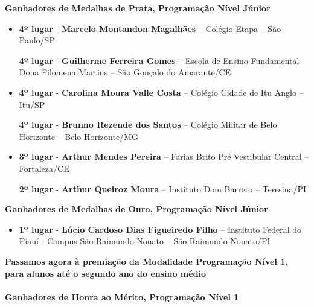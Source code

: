 \documentclass{article}
\begin{document}
\textbf{\color{blue}Ganhadores de Medalhas de Prata, \color{black}Programação Nível Júnior}
\color{black}

\begin{itemize}
\item
\textbf{4º lugar} - \textbf{Marcelo Montandon Magalhães} – Colégio Etapa – São Paulo/SP


\textbf{4º lugar} - \textbf{Guilherme Ferreira Gomes} – Escola de Ensino Fundamental Dona Filomena Martins – São Gonçalo do Amarante/CE



\item
\textbf{4º lugar} - \textbf{Carolina Moura Valle Costa} – Colégio Cidade de Itu Anglo – Itu/SP


\textbf{4º lugar} - \textbf{Brunno Rezende dos Santos} – Colégio Militar de Belo Horizonte – Belo Horizonte/MG



\item
\textbf{3º lugar} - \textbf{Arthur Mendes Pereira} – Farias Brito Pré Vestibular Central – Fortaleza/CE


\textbf{2º lugar} - \textbf{Arthur Queiroz Moura} – Instituto Dom Barreto – Teresina/PI



\end{itemize}

\textbf{\color{blue}Ganhadores de Medalhas de Ouro, \color{black}Programação Nível Júnior}
\color{black}

\begin{itemize}
\item
\textbf{1º lugar} - \textbf{Lúcio Cardoso Dias Figueiredo Filho} – Instituto Federal do Piauí - Campus São Raimundo Nonato – São Raimundo Nonato/PI



\end{itemize}

\color{blue}
\textbf{Passamos agora à premiação da Modalidade Programação Nível 1, para alunos até o segundo ano do ensino médio}\\\\
\textbf{\color{blue}Ganhadores de Honra ao Mérito, \color{black}Programação Nível 1}
\color{black}
\end{document}
